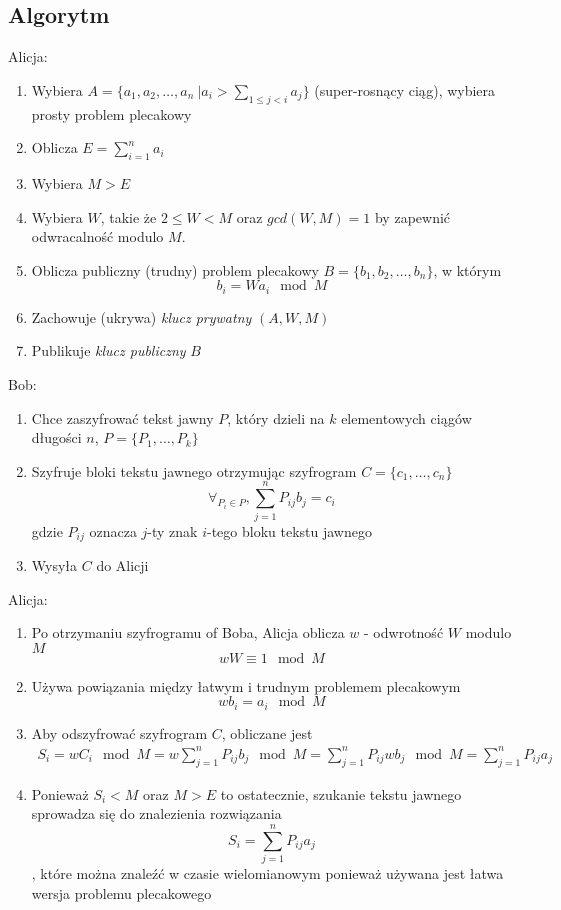 \documentclass[a4paper,11pt]{article}
\theoremstyle{mytheor}
\begin{document}
\subsection*{Algorytm}
Alicja:
\begin{enumerate}
    \item Wybiera $A = \{a_1, a_2,\ldots,a_n\ | a_i > \sum_{1 \leq j < i}a_j\}$ (super-rosnący ciąg), wybiera prosty problem plecakowy
    \item Oblicza $E = \sum_{i = 1}^n a_i$
    \item Wybiera $M > E$
    \item Wybiera $W$, takie że $2 \leq W < M$ oraz $gcd(W,M) = 1$ by zapewnić odwracalność modulo $M$.
    \item Oblicza publiczny (trudny) problem plecakowy $B = \{b_1, b_2,\ldots,b_n\}$, w którym $$b_i = Wa_i \mod M $$
    \item Zachowuje (ukrywa) \textit{klucz prywatny} $(A, W, M)$
    \item Publikuje \textit{klucz publiczny} $B$
\end{enumerate}
Bob:
\begin{enumerate}
    \item Chce zaszyfrować tekst jawny $P$, który dzieli na $k$ elementowych ciągów długości $n$, $P = \{P_1,\ldots,P_k\}$
    \item Szyfruje bloki tekstu jawnego otrzymując szyfrogram $C = \{c_1,\ldots,c_n\}$
    $$ \forall_{P_i \in P}, \sum_{j = 1}^n P_{ij}b_j = c_i $$
    gdzie $P_{ij}$ oznacza $j$-ty znak $i$-tego bloku tekstu jawnego
    \item Wysyła $C$ do Alicji
\end{enumerate}
Alicja:
\begin{enumerate}
    \item Po otrzymaniu szyfrogramu of Boba, Alicja oblicza $w$ - odwrotność $W$ modulo $M$ $$ wW \equiv 1 \mod M $$
    \item Używa powiązania między łatwym i trudnym problemem plecakowym $$ wb_i = a_i \mod M $$
    \item Aby odszyfrować szyfrogram $C$, obliczane jest
    \begin{align*}
        S_i = wC_i \mod M = w\sum_{j = 1}^n P_{ij}b_j \mod M
        = \sum_{j = 1}^n P_{ij}wb_j \mod M = \sum_{j = 1}^n P_{ij}a_j
    \end{align*}
    \item Ponieważ $S_i < M$ oraz $M > E$ to ostatecznie, szukanie tekstu jawnego sprowadza się do znalezienia rozwiązania $$ S_i = \sum_{j = 1}^n P_{ij}a_j $$, które można znaleźć w czasie wielomianowym ponieważ używana jest łatwa wersja problemu plecakowego
\end{enumerate}
\end{document}
